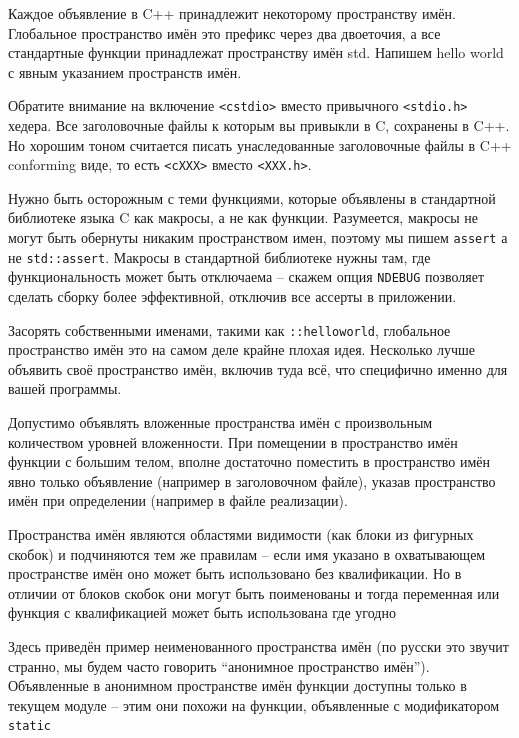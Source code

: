 \documentclass[a4paper,12pt,oneside]{article}
\begin{document}
Каждое объявление в C++ принадлежит некоторому пространству имён. Глобальное пространство имён это префикс через два двоеточия, а все стандартные функции принадлежат пространству имён std. Напишем hello world с явным указанием пространств имён.



Обратите внимание на включение \lstinline!<cstdio>! вместо привычного \lstinline!<stdio.h>! хедера. Все заголовочные файлы к которым вы привыкли в C, сохранены в C++. Но хорошим тоном считается писать унаследованные заголовочные файлы в C++ conforming виде, то есть \lstinline!<cXXX>! вместо \lstinline!<XXX.h>!.

Нужно быть осторожным с теми функциями, которые объявлены в стандартной библиотеке языка C как макросы, а не как функции. Разумеется, макросы не могут быть обернуты никаким пространством имен, поэтому мы пишем \lstinline!assert! а не \lstinline!std::assert!. Макросы в стандартной библиотеке нужны там, где функциональность может быть отключаема -- скажем опция \lstinline!NDEBUG! позволяет сделать сборку более эффективной, отключив все ассерты в приложении. 

Засорять собственными именами, такими как \lstinline!::helloworld!, глобальное пространство имён это на самом деле крайне плохая идея. Несколько лучше объявить своё пространство имён, включив туда всё, что специфично именно для вашей программы.



Допустимо объявлять вложенные пространства имён с произвольным количеством уровней вложенности. При помещении в пространство имён функции с большим телом, вполне достаточно поместить в пространство имён явно только объявление (например в заголовочном файле), указав пространство имён при определении (например в файле реализации).



Пространства имён являются областями видимости (как блоки из фигурных скобок) и подчиняются тем же правилам – если имя указано в охватывающем пространстве имён оно может быть использовано без квалификации. Но в отличии от блоков скобок они могут быть поименованы и тогда переменная или функция с квалификацией может быть использована где угодно



Здесь приведён пример неименованного пространства имён (по русски это звучит странно, мы будем часто говорить ``анонимное пространство имён''). Объявленные в анонимном пространстве имён функции доступны только в текущем модуле -- этим они похожи на функции, объявленные с модификатором \lstinline!static! 
\end{document}
